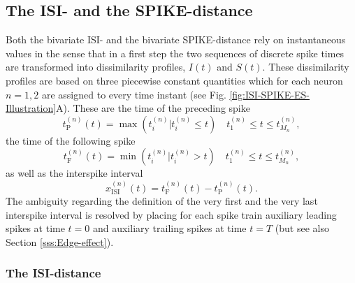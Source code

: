 \documentclass[10pt,twocolumn]{elsart5p}
\begin{document}
\subsection{\label{ss:ISI-SPIKE-Distance} The ISI- and the SPIKE-distance}

Both the bivariate ISI- and the bivariate SPIKE-distance rely on instantaneous values in the sense that in a first step the two sequences of discrete spike times are transformed into dissimilarity profiles, $I (t)$ and $S (t)$. These dissimilarity profiles are based on three piecewise constant quantities which for each neuron $n = 1, 2$ are assigned to every time instant (see Fig. \ref{fig:ISI-SPIKE-ES-Illustration}A). These are the time of the preceding spike
%
\begin{equation} \label{eq:Prev-Spike}
    t_{\mathrm {P}}^{(n)} (t) = \max(t_i^{(n)} | t_i^{(n)} \leq t)  \quad t_1^{(n)} \leq t \leq t_{M_n}^{(n)},
\end{equation}
%
the time of the following spike
%
\begin{equation} \label{eq:Foll-Spike}
    t_{\mathrm {F}}^{(n)} (t) = \min(t_i^{(n)} | t_i^{(n)} > t)  \quad t_1^{(n)} \leq t \leq t_{M_n}^{(n)},
\end{equation}
%
as well as the interspike interval
%
\begin{equation} \label{eq:ISI}
    x_{\mathrm {ISI}}^{(n)} (t) = t_{\mathrm {F}}^{(n)} (t) - t_{\mathrm {P}}^{(n)} (t).
\end{equation}
%
The ambiguity regarding the definition of the very first and the very last interspike interval is resolved by placing for each spike train auxiliary leading spikes at time $t = 0$ and auxiliary trailing spikes at time $t = T$ (but see also Section \ref{sss:Edge-effect}).


\subsubsection{\label{sss:ISI-Distance} The ISI-distance}
\end{document}
